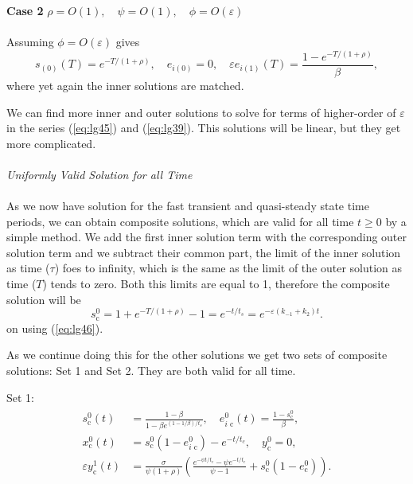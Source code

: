 \documentclass[a4paper]{report}
\theoremstyle{definition}
\begin{document}
\textbf{Case 2} \quad $\rho=O(1), \quad \psi=O(1), \quad \phi=O(\varepsilon)$
\\
\\
Assuming $\phi=O(\varepsilon)$ gives
\begin{equation}
s_{(0)}(T)=e^{-T/(1+\rho)}, \quad e_{i(0)}=0, \quad \varepsilon e_{i(1)}(T)=\frac{1-e^{-T/(1+\rho)}}{\beta},
\end{equation}
where yet again the inner solutions are matched.

We can find more inner and outer solutions to solve for terms of higher-order of $\varepsilon$ in the series (\ref{eq:lg45}) and (\ref{eq:lg39}). This solutions will be linear, but they get more complicated.
\\
\\
\textit{Uniformly Valid Solution for all Time}
\\
\\
As we now have solution for the fast transient and quasi-steady state time periods, we can obtain composite solutions, which are valid for all time $t\ge0$ by a simple method. We add the first inner solution term with the corresponding outer solution term and we subtract their common part, the limit of the inner solution as time ($\tau$) foes to infinity, which is the same as the limit of the outer solution as time ($T$) tends to zero. Both this limits are equal to 1, therefore the composite solution will be 
\begin{equation}
s_{\text{c}}^0=1+e^{-T/(1+\rho)}-1=e^{-t/t_s}=e^{-\varepsilon(k_{-1}+k_2)t}.
\end{equation}
on using (\ref{eq:lg46}).

As we continue doing this for the other solutions we get two sets of composite solutions: Set 1 and Set 2. They are both valid for all time.


Set 1:
\begin{align}
\begin{split}
s_{\text{c}}^0(t)&=\frac{1-\beta}{1-\beta e^{(1-1/\beta)/t_s}}, \quad e_{i \text{ c}}^0(t)=\frac{1-s_{\text{c}}^0}{\beta}, \\
x_{\text{c}}^0(t)&=s_{\text{c}}^0(1-e_{i \text{ c}}^0)-e^{-t/t_c}, \quad y_{\text{c}}^0=0, \\
\varepsilon y_{\text{c}}^1(t)&=\frac{\sigma}{\psi(1+\rho)}\left(\frac{e^{-\psi t/t_c}-\psi e^{-t/t_c}}{\psi -1}+s_{\text{c}}^0(1-e_{\text{c}}^0)\right).
\end{split}
\end{align}
\end{document}
